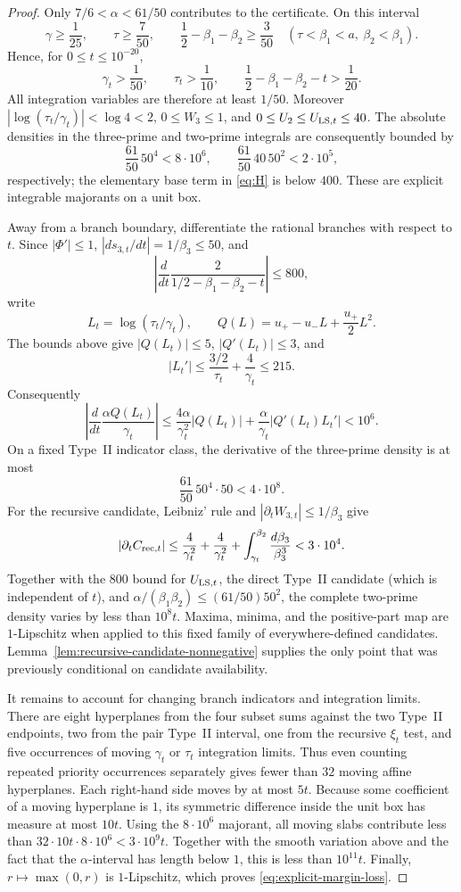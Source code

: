 \documentclass[10pt,reqno]{amsart}
\newcommand{\1}{\mathbf{1}}
\theoremstyle{plain}
\theoremstyle{remark}
\begin{document}
\begin{proof}
Only $7/6<\alpha<61/50$ contributes to the certificate.  On this interval
\[
 \gamma\ge\frac1{25},\qquad \tau\ge\frac7{50},\qquad
 \frac12-\beta_1-\beta_2\ge\frac3{50}
 \quad(\tau<\beta_1<a,\ \beta_2<\beta_1).
\]
Hence, for $0\le t\le10^{-20}$,
\[
 \gamma_t>\frac1{50},\qquad \tau_t>\frac1{10},\qquad
 \frac12-\beta_1-\beta_2-t>\frac1{20}.
\]
All integration variables are therefore at least $1/50$.  Moreover
$|\log(\tau_t/\gamma_t)|<\log4<2$, $0\le W_3\le1$, and
$0\le U_2\le U_{{\rm LS},t}\le40$.  The absolute densities in the
three-prime and two-prime integrals are consequently bounded by
\[
 \frac{61}{50}\,50^4<8\cdot10^6,\qquad
 \frac{61}{50}\,40\,50^2<2\cdot10^5,
\]
respectively; the elementary base term in \eqref{eq:H} is below $400$.
These are explicit integrable majorants on a unit box.

Away from a branch boundary, differentiate the rational branches with
respect to $t$.  Since $|\Phi'|\le1$, $|d s_{3,t}/dt|=1/\beta_3\le50$,
and
\[
 \left|\frac d{dt}\frac2{1/2-\beta_1-\beta_2-t}\right|
 \le800,
\]
write
\[
 L_t=\log(\tau_t/\gamma_t),\qquad
 Q(L)=u_+-u_-L+\frac{u_+}{2}L^2.
\]
The bounds above give $|Q(L_t)|\le5$, $|Q'(L_t)|\le3$, and
\[
 |L_t'|\le\frac{3/2}{\tau_t}+\frac4{\gamma_t}\le215.
\]
Consequently
\[
 \left|\frac d{dt}\frac{\alpha Q(L_t)}{\gamma_t}\right|
 \le\frac{4\alpha}{\gamma_t^2}|Q(L_t)|
   +\frac{\alpha}{\gamma_t}|Q'(L_t)L_t'|<10^6.
\]
On a fixed Type~II indicator class, the derivative of the three-prime
density is at most
\[
 \frac{61}{50}\,50^4\cdot50<4\cdot10^8.
\]
For the recursive candidate, Leibniz' rule and
$|\partial_tW_{3,t}|\le1/\beta_3$ give
\[
 |\partial_t C_{{\rm rec},t}|
 \le\frac4{\gamma_t^2}
   +\frac{4}{\gamma_t^2}
   +\int_{\gamma_t}^{\beta_2}\frac{d\beta_3}{\beta_3^3}
 <3\cdot10^4.
\]
Together with the $800$ bound for $U_{{\rm LS},t}$, the direct Type~II
candidate (which is independent of $t$), and
$\alpha/(\beta_1\beta_2)\le(61/50)50^2$, the complete two-prime density
varies by less than $10^8t$.  Maxima, minima, and the positive-part map are
$1$-Lipschitz when applied to this fixed family of everywhere-defined
candidates.  Lemma~\ref{lem:recursive-candidate-nonnegative} supplies the
only point that was previously conditional on candidate availability.

It remains to account for changing branch indicators and integration
limits.  There are eight hyperplanes from the four subset sums against the
two Type~II endpoints, two from the pair Type~II interval, one from the
recursive $\xi_t$ test, and five occurrences of moving $\gamma_t$ or
$\tau_t$ integration limits.  Thus even counting repeated priority
occurrences separately gives fewer than $32$ moving affine hyperplanes.
Each right-hand side moves by at most $5t$.
Because some coefficient of a moving hyperplane is $1$, its symmetric
difference inside the unit box has measure at most $10t$.  Using the
$8\cdot10^6$ majorant, all moving slabs contribute less than
\(32\cdot10t\cdot8\cdot10^6<3\cdot10^9t\).
Together with the smooth variation above and the fact that the
$\alpha$-interval has length below $1$, this is less than $10^{11}t$.
Finally, $r\mapsto\max(0,r)$ is $1$-Lipschitz, which proves
\eqref{eq:explicit-margin-loss}.


\end{proof}
\end{document}
